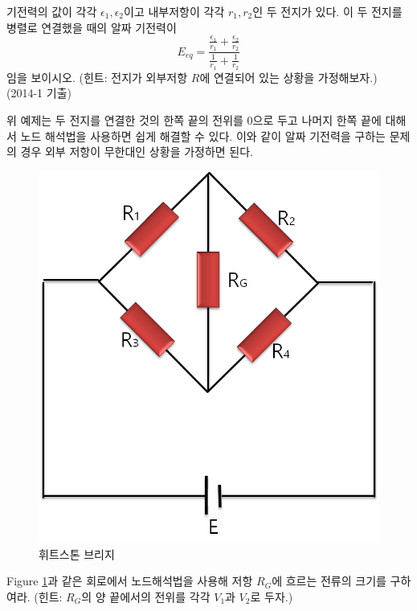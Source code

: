 \begin{exercise}
 기전력의 값이 각각 $\epsilon_1, \epsilon_2$이고 내부저항이 각각 $r_1, r_2$인 두 전지가 있다. 이 두 전지를 병렬로 연결했을 때의 알짜 기전력이
 \begin{equation}
 E_{eq}=\frac{\frac{\epsilon_1}{r_1}+\frac{\epsilon_2}{r_2}}{\frac{1}{r_1}+\frac{1}{r_2}}
 \end{equation}
임을 보이시오. (힌트: 전지가 외부저항 $R$에 연결되어 있는 상황을 가정해보자.) (2014-1 기출)
\end{exercise}
위 예제는 두 전지를 연결한 것의 한쪽 끝의 전위를 0으로 두고 나머지 한쪽 끝에 대해서 노드 해석법을 사용하면 쉽게 해결할 수 있다. 이와 같이 알짜 기전력을 구하는 문제의 경우 외부 저항이 무한대인 상황을 가정하면 된다.


\begin{figure}[h]
\centering\includegraphics[scale=0.2]{Pictures/wheatstone.png}
\caption{휘트스톤 브리지}
\label{fig:wheatstone}
\end{figure}
\begin{exercise}
Figure \ref{fig:wheatstone}과 같은 회로에서 노드해석법을 사용해 저항 $R_G$에 흐르는 전류의 크기를 구하여라. (힌트: $R_G$의 양 끝에서의 전위를 각각 $V_1$과 $V_2$로 두자.)
\end{exercise}

